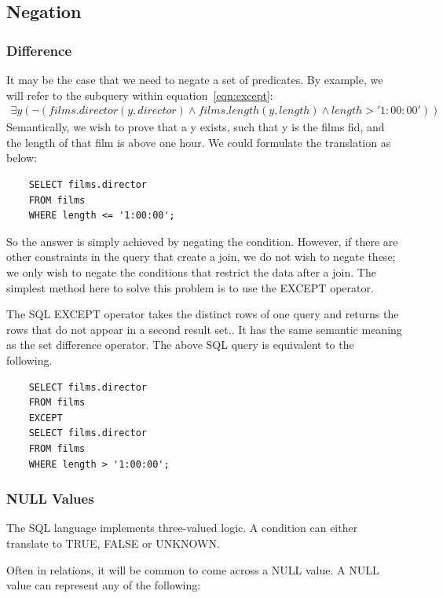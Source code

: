 \documentclass[a4paper, 11pt]{article}
\begin{document}
  \subsection{Negation}

    \subsubsection{Difference}

    It may be the case that we need to negate a set of predicates. By example,
    we will refer to the subquery within
    equation~\ref{eqn:except}:
    \begin{multline}
    \exists y(\lnot(films.director(y,
      director) \land films.length(y, length) \land length > '1:00:00'))
    \end{multline}
    Semantically, we wish to prove that a y exists, such that y is the films
    fid, and the length of that film is above one hour. We could formulate the
    translation as below:
    \begin{verbatim}
    SELECT films.director
    FROM films
    WHERE length <= '1:00:00';
    \end{verbatim}
    So the answer is simply achieved by negating the condition. However, if
    there are other constraints in the query that create a join, we do not wish
    to negate these; we only wish to negate the conditions that restrict the
    data after a join. The simplest method here to solve this problem is to use
    the EXCEPT operator.

    The SQL EXCEPT operator takes the distinct rows of one query and returns
    the rows that do not appear in a second result set.\cite{wiki:EXCEPT}. It
    has the same semantic meaning as the set difference operator. The
    above SQL query is equivalent to the following.

    \begin{verbatim}
    SELECT films.director
    FROM films
    EXCEPT
    SELECT films.director
    FROM films
    WHERE length > '1:00:00';
    \end{verbatim}

  \subsubsection{NULL Values}
    The SQL language implements three-valued logic. A condition can either
    translate to TRUE, FALSE or UNKNOWN.

    Often in relations, it will be common to come across a NULL value. A NULL
    value can represent any of the following\cite{pmbNULL}:
\end{document}

